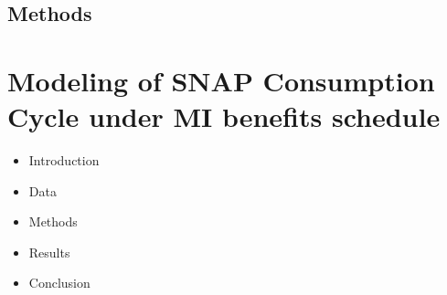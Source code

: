 \documentclass[11pt,letterpaperpaper,]{book}
\providecommand{\tightlist}{%
  \setlength{\itemsep}{0pt}\setlength{\parskip}{0pt}}
\begin{document}
\hypertarget{methods}{\section{Methods}\label{methods}}

\chapter{Modeling of SNAP Consumption Cycle under MI benefits
schedule}\label{snap-consumption}

\begin{itemize}
\tightlist
\item
  Introduction
\item
  Data
\item
  Methods
\item
  Results
\item
  Conclusion
\end{itemize}


\end{document}
